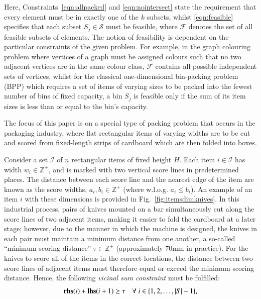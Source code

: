 \documentclass[a4paper,11pt,authoryear]{elsarticle}
\begin{document}
\noindent Here, Constraints~\eqref{eqn:allpacked} and \eqref{eqn:nointersect} state the requirement that every element must be in exactly one of the $k$ subsets, whilst \eqref{eqn:feasible} specifies that each subset $S_j \in \mathcal{S}$ must be feasible, where $\mathcal{F}$ denotes the set of all feasible subsets of elements. The notion of feasibility is dependent on the particular constraints of the given problem. For example, in the graph colouring problem where vertices of a graph must be assigned colours such that no two adjacent vertices are in the same colour class, $\mathcal{F}$ contains all possible independent sets of vertices, whilst for the classical one-dimensional bin-packing problem (BPP) which requires a set of items of varying sizes to be packed into the fewest number of bins of fixed capacity, a bin $S_j$ is feasible only if the sum of its item sizes is less than or equal to the bin's capacity.

The focus of this paper is on a special type of packing problem that occurs in the packaging industry, where flat rectangular items of varying widths are to be cut and scored from fixed-length strips of cardboard which are then folded into boxes. 


Consider a set $\mathcal{I}$ of $n$ rectangular items of fixed height $H$. Each item $i \in \mathcal{I}$ has width $w_i \in \mathbb{Z}^+$, and is marked with two vertical score lines in predetermined places. The distance between each score line and the nearest edge of the item are known as the score widths, $a_i, b_i \in \mathbb{Z}^+$ (where w.l.o.g. $a_i \leq b_i$). An example of an item $i$ with these dimensions is provided in Fig.~\ref{fig:itemsdimknives}. In this industrial process, pairs of knives mounted on a bar simultaneously cut along the score lines of two adjacent items, making it easier to fold the cardboard at a later stage; however, due to the manner in which the machine is designed, the knives in each pair must maintain a minimum distance from one another, a so-called ``minimum scoring distance'' $\tau \in \mathbb{Z}^+$ (approximately 70mm in practice). For the knives to score all of the items in the correct locations, the distance between two score lines of adjacent items must therefore equal or exceed the minimum scoring distance. Hence, the following \emph{vicinal sum constraint} must be fulfilled:
\begin{equation}
	\textbf{rhs}(i) + \textbf{lhs}(i+1) \geq \tau \quad \forall \hspace{1mm} i \in \{1,2,\dotsc,|S|- 1\},
	\label{eqn:vsc}
\end{equation}
\end{document}
